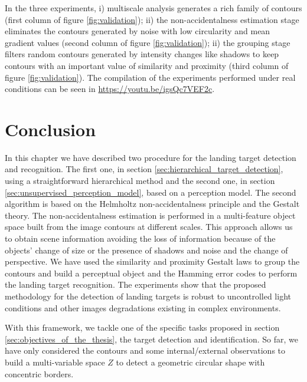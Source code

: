In the three experiments, i) multiscale analysis generates a rich family of contours (first column of figure \ref{fig:validation}); ii) the non-accidentalness estimation stage eliminates the contours generated by noise with low circularity and mean gradient values (second column of figure \ref{fig:validation}); ii) the grouping stage filters random contours generated by intensity changes like shadows to keep contours with an important value of similarity and proximity (third column of figure \ref{fig:validation}). The compilation of the experiments performed under real conditions can be seen in \url{https://youtu.be/igsQc7VEF2c}.

\section{Conclusion}\label{sec:conclusions_landing_target}
In this chapter we have described two procedure for the landing target detection and recognition. The first one, in section \ref{sec:hierarchical_target_detection}, using a straightforward hierarchical method and the second one, in section \ref{sec:unsupervised_perception_model}, based on a perception model. The second algorithm is based on the Helmholtz non-accidentalness principle and the Gestalt theory. The non-accidentalness estimation is performed in a multi-feature object space built from the image contours at different scales. This approach allows us to obtain scene information avoiding the loss of information because of the objects' change of size or the presence of shadows and noise and the change of perspective. We have used the similarity and proximity Gestalt laws to group the contours and build a perceptual object and the Hamming error codes to perform the landing target recognition. The experiments show that the proposed methodology for the detection of landing targets is robust to uncontrolled light conditions and other images degradations existing in complex environments.

With this framework, we tackle one of the specific tasks proposed in section \ref{sec:objectives_of_the_thesis}, the target detection and identification. So far, we have only considered the contours and some internal/external observations to build a multi-variable space $Z$ to detect a geometric circular shape with concentric borders. 

